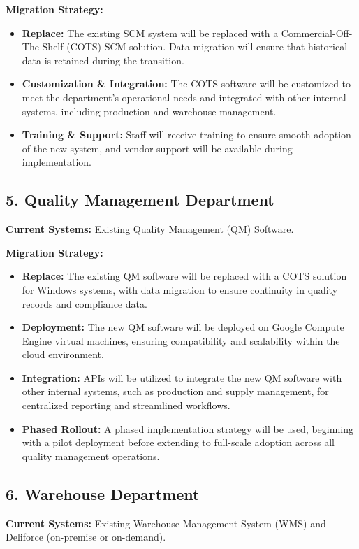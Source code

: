\textbf{Migration Strategy:}
\begin{itemize}
    \item \textbf{Replace:} The existing SCM system will be replaced with a Commercial-Off-The-Shelf (COTS) SCM solution. Data migration will ensure that historical data is retained during the transition.
    \item \textbf{Customization \& Integration:} The COTS software will be customized to meet the department's operational needs and integrated with other internal systems, including production and warehouse management.
    \item \textbf{Training \& Support:} Staff will receive training to ensure smooth adoption of the new system, and vendor support will be available during implementation.
\end{itemize}

\subsection{5. Quality Management Department} 
\textbf{Current Systems:} Existing Quality Management (QM) Software.

\textbf{Migration Strategy:}
\begin{itemize}
    \item \textbf{Replace:} The existing QM software will be replaced with a COTS solution for Windows systems, with data migration to ensure continuity in quality records and compliance data.
    \item \textbf{Deployment:} The new QM software will be deployed on Google Compute Engine virtual machines, ensuring compatibility and scalability within the cloud environment.
    \item \textbf{Integration:} APIs will be utilized to integrate the new QM software with other internal systems, such as production and supply management, for centralized reporting and streamlined workflows.
    \item \textbf{Phased Rollout:} A phased implementation strategy will be used, beginning with a pilot deployment before extending to full-scale adoption across all quality management operations.
\end{itemize}

\subsection{6. Warehouse Department} 
\textbf{Current Systems:} Existing Warehouse Management System (WMS) and Deliforce (on-premise or on-demand).

